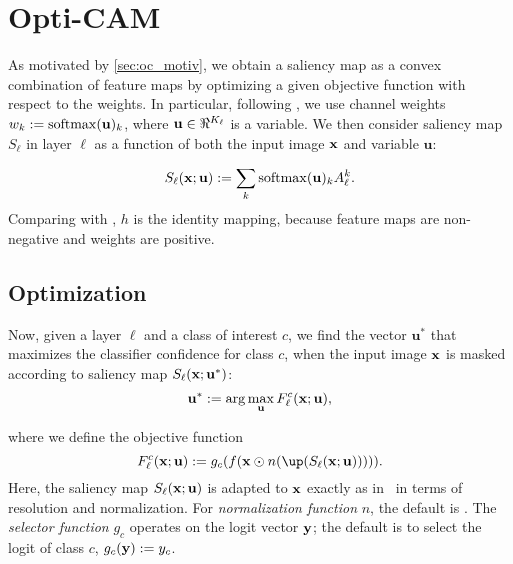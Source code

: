 \section{Opti-CAM}
\label{sec:oc_def}
As motivated by \autoref{sec:oc_motiv}, we obtain a saliency map as a convex combination of feature maps
 by optimizing a given objective function with respect to the weights.
In particular, following \autocite{wang2020score}, we use channel weights $w_k \mathrel{:=} \operatorname{softmax}(
	\mathbf{u})_k$, where $\mathbf{u} \in \real^{K_\ell}$ is a variable.
We then consider saliency map $S_\ell$ in layer $\ell$ as a function of both the input image $\mathbf{x}$ 
and variable $\mathbf{u}$:

\begin{equation}
    S_\ell(\mathbf{x}; \mathbf{u}) \mathrel{:=} \sum_k \operatorname{softmax}(\mathbf{u})_k A^k_\ell.
\label{eq:v-sal}
\end{equation}
Comparing with , $h$ is the identity mapping, because feature maps are non-negative and
 weights are positive.


\subsection{Optimization}
Now, given a layer $\ell$ and a class of interest $c$, we find the vector $\mathbf{u}^*$ that
 maximizes the classifier confidence for class $c$, when the input image $\mathbf{x}$ is masked according 
 to saliency map $S_\ell(\mathbf{x}; \mathbf{u}^*)$:
\begin{equation}
	\mathbf{u}^* \mathrel{:=} \arg\max_{\mathbf{u}} F^c_\ell(\mathbf{x}; \mathbf{u}),
\label{eq:opt}
\end{equation}

where we define the objective function
\begin{equation}
	F^c_\ell(\vx; \mathbf{u}) \defn g_c(f(\vx \odot n(\up(S_\ell(\vx; \mathbf{u}))))).
\label{eq:obj}
\end{equation}
Here, the saliency map $S_\ell(\mathbf{x}; \mathbf{u})$ is adapted to $\mathbf{x}$ exactly as in~ in 
terms of resolution and normalization. For \emph{normalization function} $n$, the default is
 . 
The \emph{selector function} $g_c$ operates on the logit vector $\mathbf{y}$; the default is to select the
 logit of class $c$, \ie $g_c(\mathbf{y}) \mathrel{:=} y_c$. %

